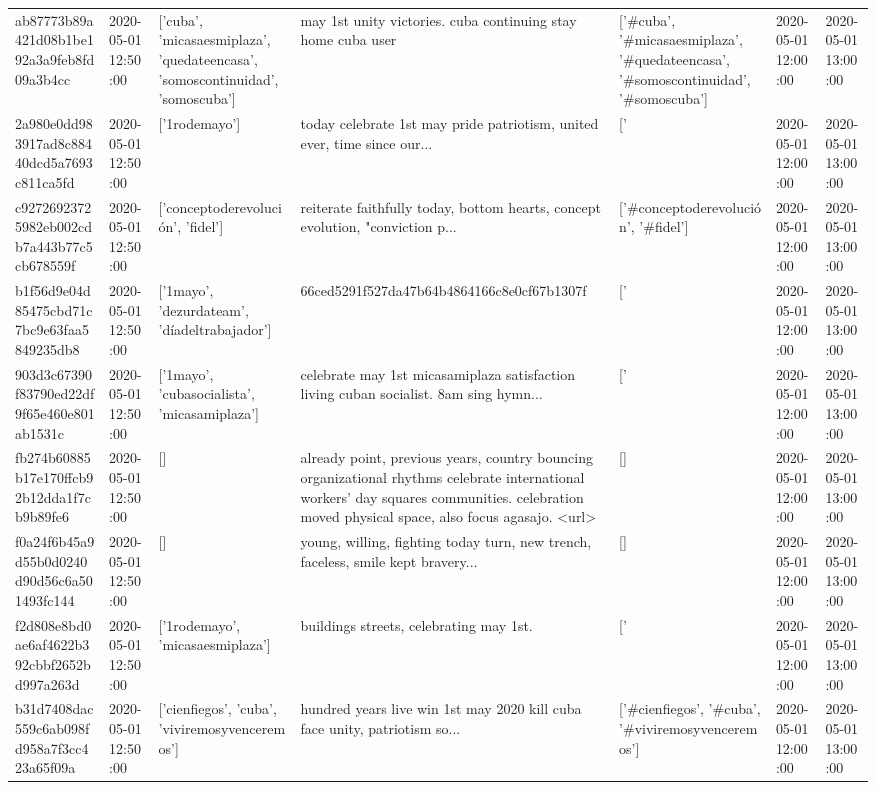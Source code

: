 \begin{tabular}{lllllll}
ab87773b89a421d08b1be192a3a9feb8fd09a3b4cc & 2020-05-01 12:50:00 & ['cuba', 'micasaesmiplaza', 'quedateencasa', 'somoscontinuidad', 'somoscuba'] & may 1st unity victories. cuba continuing stay home cuba user & ['#cuba', '#micasaesmiplaza', '#quedateencasa', '#somoscontinuidad', '#somoscuba'] & 2020-05-01 12:00:00 & 2020-05-01 13:00:00 \\
2a980e0dd983917ad8c88440dcd5a7693c811ca5fd & 2020-05-01 12:50:00 & ['1rodemayo'] & today celebrate 1st may pride patriotism, united ever, time since our... & ['#1rodemayo'] & 2020-05-01 12:00:00 & 2020-05-01 13:00:00 \\
c92726923725982eb002cdb7a443b77c5cb678559f & 2020-05-01 12:50:00 & ['conceptoderevolución', 'fidel'] & reiterate faithfully today, bottom hearts, concept evolution, "conviction p... & ['#conceptoderevolución', '#fidel'] & 2020-05-01 12:00:00 & 2020-05-01 13:00:00 \\
b1f56d9e04d85475cbd71c7bc9e63faa5849235db8 & 2020-05-01 12:50:00 & ['1mayo', 'dezurdateam', 'díadeltrabajador'] & 66ced5291f527da47b64b4864166c8e0cf67b1307f & ['#1mayo', '#dezurdateam', '#díadeltrabajador'] & 2020-05-01 12:00:00 & 2020-05-01 13:00:00 \\
903d3c67390f83790ed22df9f65e460e801ab1531c & 2020-05-01 12:50:00 & ['1mayo', 'cubasocialista', 'micasamiplaza'] & celebrate may 1st micasamiplaza satisfaction living cuban socialist. 8am sing hymn... & ['#1mayo', '#cubasocialista', '#micasamiplaza'] & 2020-05-01 12:00:00 & 2020-05-01 13:00:00 \\
fb274b60885b17e170ffcb92b12dda1f7cb9b89fe6 & 2020-05-01 12:50:00 & [] & already point, previous years, country bouncing organizational rhythms celebrate international workers' day squares communities. celebration moved physical space, also focus agasajo. <url> & [] & 2020-05-01 12:00:00 & 2020-05-01 13:00:00 \\
f0a24f6b45a9d55b0d0240d90d56c6a501493fc144 & 2020-05-01 12:50:00 & [] & young, willing, fighting today turn, new trench, faceless, smile kept bravery... & [] & 2020-05-01 12:00:00 & 2020-05-01 13:00:00 \\
f2d808e8bd0ae6af4622b392cbbf2652bd997a263d & 2020-05-01 12:50:00 & ['1rodemayo', 'micasaesmiplaza'] & buildings streets, celebrating may 1st. & ['#1rodemayo', '#micasaesmiplaza'] & 2020-05-01 12:00:00 & 2020-05-01 13:00:00 \\
b31d7408dac559c6ab098fd958a7f3cc423a65f09a & 2020-05-01 12:50:00 & ['cienfiegos', 'cuba', 'viviremosyvenceremos'] & hundred years live win 1st may 2020 kill cuba face unity, patriotism so... & ['#cienfiegos', '#cuba', '#viviremosyvenceremos'] & 2020-05-01 12:00:00 & 2020-05-01 13:00:00 \\

\end{tabular}
